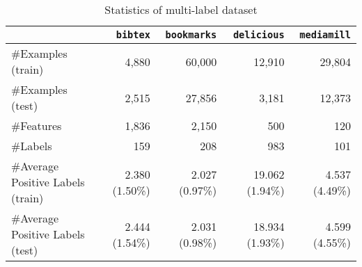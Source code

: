 \begin{table}[!h]
\centering
\caption{Statistics of multi-label dataset}
\label{tab:dataset}
\begin{tabular}{l*{4}{r}} \hline \hline
                                  & \texttt{bibtex} & \texttt{bookmarks} & \texttt{delicious} & \texttt{mediamill} \\ \hline 
\#Examples (train)                & 4,880           & 60,000             & 12,910             & 29,804         \\
\#Examples (test)                 & 2,515           & 27,856             & 3,181              & 12,373         \\
\#Features                        & 1,836           & 2,150              & 500                & 120            \\
\#Labels                          & 159             & 208                & 983                & 101            \\
\#Average Positive Labels (train) & 2.380 (1.50\%)  & 2.027 (0.97\%)     & 19.062 (1.94\%)    & 4.537 (4.49\%) \\
\#Average Positive Labels (test)  & 2.444 (1.54\%)  & 2.031 (0.98\%)     & 18.934 (1.93\%)    & 4.599 (4.55\%) \\
%
\hline
\end{tabular}
\end{table}

